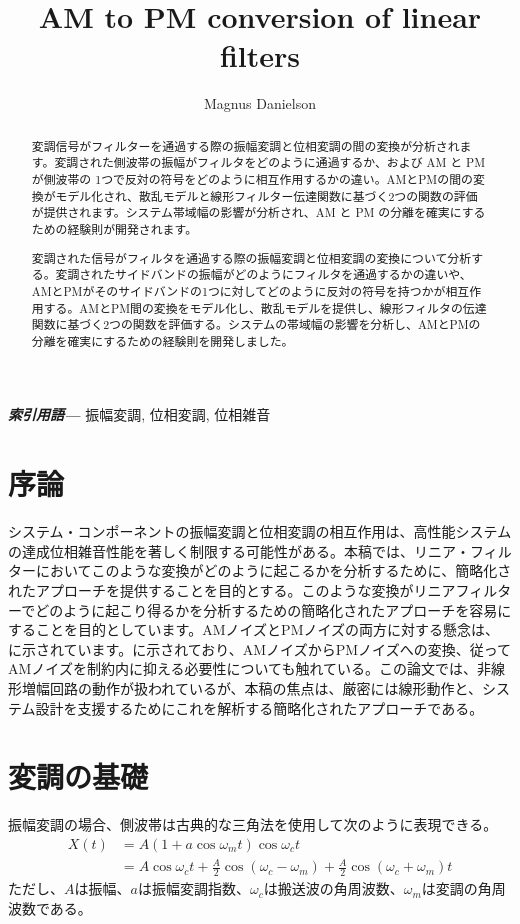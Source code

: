 \documentclass[article]{jlreq}
\providecommand{\keywords}[1]
{
  \small	
  \textbf{\textit{索引用語---}} #1
}
\begin{document}
\title{AM to PM conversion of linear filters}
\author{Magnus Danielson}
\maketitle

\begin{abstract}
    変調信号がフィルターを通過する際の振幅変調と位相変調の間の変換が分析されます。変調された側波帯の振幅がフィルタをどのように通過するか、および AM と PM が側波帯の 1つで反対の符号をどのように相互作用するかの違い。AMとPMの間の変換がモデル化され、散乱モデルと線形フィルター伝達関数に基づく2つの関数の評価が提供されます。システム帯域幅の影響が分析され、AM と PM の分離を確実にするための経験則が開発されます。

    変調された信号がフィルタを通過する際の振幅変調と位相変調の変換について分析する。変調されたサイドバンドの振幅がどのようにフィルタを通過するかの違いや、AMとPMがそのサイドバンドの1つに対してどのように反対の符号を持つかが相互作用する。AMとPM間の変換をモデル化し、散乱モデルを提供し、線形フィルタの伝達関数に基づく2つの関数を評価する。システムの帯域幅の影響を分析し、AMとPMの分離を確実にするための経験則を開発しました。
\end{abstract}

\keywords{振幅変調, 位相変調, 位相雑音}

\section{序論}

システム・コンポーネントの振幅変調と位相変調の相互作用は、高性能システムの達成位相雑音性能を著しく制限する可能性がある。本稿では、リニア・フィルターにおいてこのような変換がどのように起こるかを分析するために、簡略化されたアプローチを提供することを目的とする。このような変換がリニアフィルターでどのように起こり得るかを分析するための簡略化されたアプローチを容易にすることを目的としています。AMノイズとPMノイズの両方に対する懸念は、\cite{ref:1}に示されています。\cite{ref:1}に示されており、AMノイズからPMノイズへの変換、従ってAMノイズを制約内に抑える必要性についても触れている。この論文では、非線形増幅回路の動作が扱われているが、本稿の焦点は、厳密には線形動作と、システム設計を支援するためにこれを解析する簡略化されたアプローチである。

\section{変調の基礎}
振幅変調の場合、側波帯は古典的な三角法を使用して次のように表現できる。
%
\begin{equation}
    \begin{split}
        X(t)    &= A (1+a\cos\omega_m t)\cos\omega_c t\\
        &= A\cos\omega_c t + \frac{A}{2}\cos(\omega_c - \omega_m) + \frac{A}{2}\cos(\omega_c + \omega_m) t
        \label{eq:am}
    \end{split}
\end{equation}
%
ただし、$A$は振幅、$a$は振幅変調指数、$\omega_c$は搬送波の角周波数、$\omega_m$は変調の角周波数である。
\end{document}
